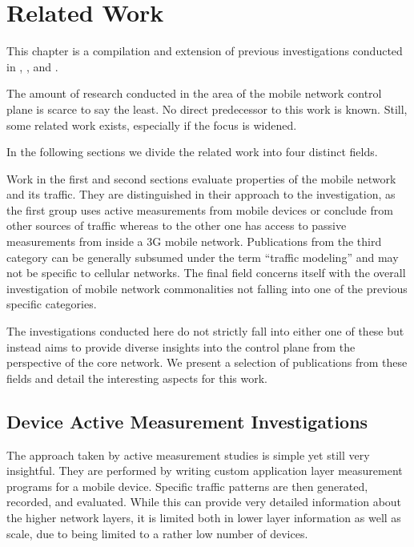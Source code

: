 \section{Related Work}
\label{c4:relwork}


This chapter is a compilation and extension of previous investigations conducted in \cite{metzger2012research}, \cite{metzger2014jcnc}, and \cite{metzger2014lossmodel}. 

The amount of research conducted in the area of the mobile network control plane is scarce to say the least. No direct predecessor to this work is known. Still, some related work exists, especially if the focus is widened.

In the following sections we divide the related work into four distinct fields.

Work in the first and second sections evaluate properties of the mobile network and its traffic. They are distinguished in their approach to the investigation, as the first group uses active measurements from mobile devices or conclude from other sources of traffic whereas to the other one has access to passive measurements from inside a \gls{3G} mobile network. Publications from the third category can be generally subsumed under the term ``traffic modeling'' and may not be specific to cellular networks. The final field concerns itself with the overall investigation of mobile network commonalities not falling into one of the previous specific categories.

The investigations conducted here do not strictly fall into either one of these but instead aims to provide diverse insights into the control plane from the perspective of the core network. We present a selection of publications from these fields and detail the interesting aspects for this work.


\subsection{Device Active Measurement Investigations}

The approach taken by active measurement studies is simple yet still very insightful. They are performed by writing custom application layer measurement programs for a mobile device. Specific traffic patterns are then generated, recorded, and evaluated. While this can provide very detailed information about the higher network layers, it is limited both in lower layer information as well as scale, due to being limited to a rather low number of devices.

